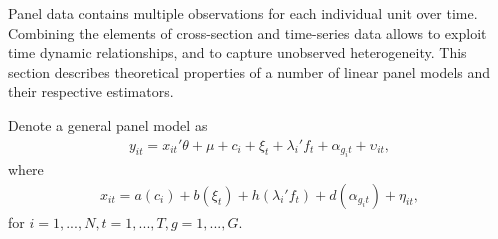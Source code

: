 Panel data contains multiple observations for each individual unit over time. Combining the elements of cross-section and time-series data allows to exploit time dynamic relationships, and to capture unobserved heterogeneity. This section describes theoretical properties of a number of linear panel models and their respective estimators.  %

Denote a general panel model as
\begin{align} \label{eqn:general}
y_{it} = x_{it}'\theta + \mu + c_i + \xi_t + \lambda_i' f_t + \alpha_{g_{i}t} + \upsilon_{it},
\end{align}
where 
\begin{align} \label{eqn:regressor}
x_{it} = a(c_i) +  b(\xi_t) +  h(\lambda_i' f_t) + d (\alpha_{g_{i}t}) + \eta_{it},
\end{align}
for $i = 1,...,N, t = 1,...,T, g = 1,..., G.$  

